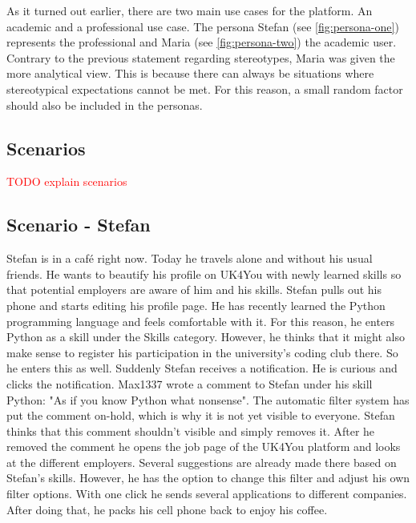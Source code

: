 As it turned out earlier, there are two main use cases for the platform.
An academic and a professional use case.
The persona Stefan (see \autoref{fig:persona-one}) represents the professional and Maria (see \autoref{fig:persona-two}) the academic user.
Contrary to the previous statement regarding stereotypes, Maria was given the more analytical view.
This is because there can always be situations where stereotypical expectations cannot be met.
For this reason, a small random factor should also be included in the personas.

\subsection{Scenarios}
\textcolor{red}{TODO explain scenarios}

\subsection{Scenario - Stefan}
Stefan is in a café right now.
Today he travels alone and without his usual friends.
He wants to beautify his profile on UK4You with newly learned skills so that potential employers are aware of him and his skills.
Stefan pulls out his phone and starts editing his profile page.
He has recently learned the Python programming language and feels comfortable with it.
For this reason, he enters Python as a skill under the Skills category.
However, he thinks that it might also make sense to register his participation in the university's coding club there.
So he enters this as well.
Suddenly Stefan receives a notification.
He is curious and clicks the notification.
Max1337 wrote a comment to Stefan under his skill Python: "As if you know Python what nonsense".
The automatic filter system has put the comment on-hold, which is why it is not yet visible to everyone.
Stefan thinks that this comment shouldn't visible and simply removes it.
After he removed the comment he opens the job page of the UK4You platform and looks at the different employers.
Several suggestions are already made there based on Stefan's skills.
However, he has the option to change this filter and adjust his own filter options.
With one click he sends several applications to different companies.
After doing that, he packs his cell phone back to enjoy his coffee.

